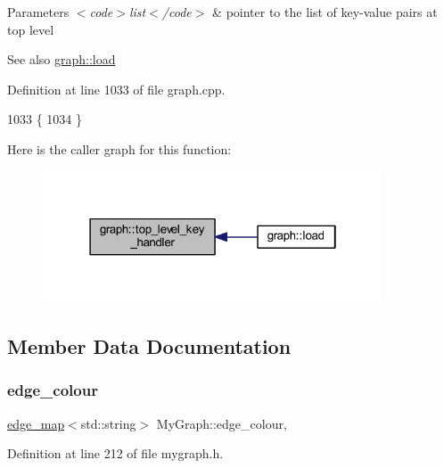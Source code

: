 \begin{DoxyParams}{Parameters}
{\em $<$code$>$list$<$/code$>$} & pointer to the list of key-\/value pairs at top level \\
\hline
\end{DoxyParams}
\begin{DoxySeeAlso}{See also}
\mbox{\hyperlink{classgraph_ac28cb3468623a480709d3329033d4ec8}{graph\+::load}} 
\end{DoxySeeAlso}


Definition at line 1033 of file graph.\+cpp.


\begin{DoxyCode}
1033                                               \{
1034 \}
\end{DoxyCode}
Here is the caller graph for this function\+:
\nopagebreak
\begin{figure}[H]
\begin{center}
\leavevmode
\includegraphics[width=286pt]{classgraph_a33bc9b45f0d4738c491535147b703cc5_icgraph}
\end{center}
\end{figure}


\subsection{Member Data Documentation}
\mbox{\label{class_my_graph_aa10654166ca504696731c7f8011a5680}} 
\subsubsection{\texorpdfstring{edge\+\_\+colour}{edge\_colour}}
{\footnotesize\ttfamily \mbox{\hyperlink{classedge__map}{edge\+\_\+map}}$<$std\+::string$>$ My\+Graph\+::edge\+\_\+colour\hspace{0.3cm}{\ttfamily [protected]}, {\ttfamily [inherited]}}



Definition at line 212 of file mygraph.\+h.

